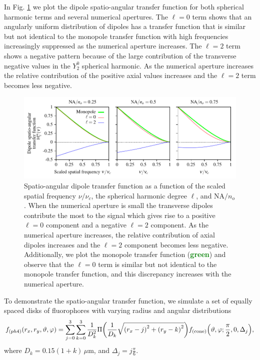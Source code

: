 \documentclass[]{osa-article}
\let\originalleft\left
\let\originalright\right
\renewcommand{\left}{\mathopen{}\mathclose\bgroup\originalleft}
\renewcommand{\right}{\aftergroup\egroup\originalright}
\begin{document}
 In Fig. \ref{fig:dsatf} we plot the dipole spatio-angular transfer function for
 both spherical harmonic terms and several numerical apertures. The $\ell=0$
 term shows that an angularly uniform distribution of dipoles has a transfer
 function that is similar but not identical to the monopole transfer function
 with high frequencies increasingly suppressed as the numerical aperture
 increases. The $\ell=2$ term shows a negative pattern because of the large
 contribution of the transverse negative values in the $Y_2^0$ spherical
 harmonic. As the numerical aperture increases the relative contribution of the
 positive axial values increases and the $\ell=2$ term becomes less negative.
 
\begin{figure}[ht]
 \centering
   \centering
   \includegraphics[scale=0.8]{../figures/paratfs/satf.pdf}
   \caption{Spatio-angular dipole transfer function as a function of the scaled
     spatial frequency $\nu/\nu_c$, the spherical harmonic degree $\ell$, and
     $\text{NA}/n_o$. When the numerical aperture is small the transverse
     dipoles contribute the most to the signal which gives rise to a positive
     $\ell=0$ component and a negative $\ell=2$ component. As the numerical
     aperture increases, the relative contribution of axial dipoles increases
     and the $\ell=2$ component becomes less negative. Additionally, we plot the
     monopole transfer function (\textcolor{green}{\textbf{green}}) and observe
     that the $\ell=0$ term is similar but not identical to the monopole
     transfer function, and this discrepancy increases with the numerical aperture.}
   \label{fig:dsatf}
 \end{figure}

 To demonstrate the spatio-angular transfer function, we simulate a set of
 equally spaced disks of fluorophores with varying radius and angular
 distributions
 \begin{align}
   f_{(ph4)}(r_x, r_y, \vartheta, \varphi) = \sum_{j=0}^3 \sum_{k=0}^3 \frac{1}{D_k^2}\Pi\left(\frac{1}{D_k}\sqrt{\left(r_x - j\right)^2 + \left(r_y - k\right)^2}\right)f_{\text{(cone)}}\left(\vartheta, \varphi; \frac{\pi}{2}, 0, \Delta_j\right),\label{eq:phantom4}
 \end{align}
 where $D_k = 0.15(1+k)\, \mu$m, and $\Delta_j = j\frac{\pi}{6}$. 
 
\end{document}
